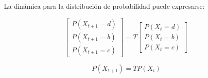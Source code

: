 \documentclass[11pt]{beamer}
\begin{document}
\begin{frame}
\begin{columns}
\begin{column}{0.5\textwidth}
			La dinámica para la distribución de probabilidad puede expresarse:
			
			\begin{equation}
			\begin{bmatrix}
			P(X_{t+1}  = d) \\
			P(X_{t+1}  = b)\\
			P(X_{t+1}  = c) 	
			\end{bmatrix} = 
			T \begin{bmatrix}
			P(X_{t}  = d) \\
			P(X_{t}  = b)\\
			P(X_{t}  = c) 	
			\end{bmatrix}
			\end{equation}
			
			\begin{equation}
			P(X_{t+1}) = TP(X_{t})
			\end{equation}
		\end{column}

	\end{columns}
	
\end{frame}
\end{document}
